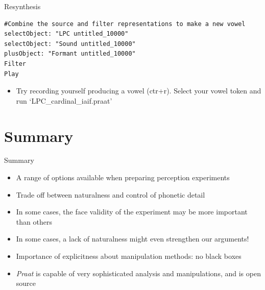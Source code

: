 \documentclass{beamer}
\begin{document}
\begin{frame}[fragile]{Resynthesis}
\begin{lstlisting}
#Combine the source and filter representations to make a new vowel
selectObject: "LPC untitled_10000"
selectObject: "Sound untitled_10000"
plusObject: "Formant untitled_10000"
Filter
Play
\end{lstlisting}
\begin{itemize}
\item{Try recording yourself producing a vowel (ctr+r). Select your vowel token and run `LPC\_cardinal\_iaif.praat'}
\end{itemize}
\end{frame}
\section{Summary}
\begin{frame}{Summary}
\begin{itemize}
\item{A range of options available when preparing perception experiments}
\item{Trade off between naturalness and control of phonetic detail}
\item{In some cases, the face validity of the experiment may be more important than others}
\item{In some cases, a lack of naturalness might even strengthen our arguments!}
\item{Importance of explicitness about manipulation methods: no black boxes}
\item{\textit{Praat} is capable of very sophisticated analysis and manipulations, and is open source}
\end{itemize}

\end{frame}
\end{document}
